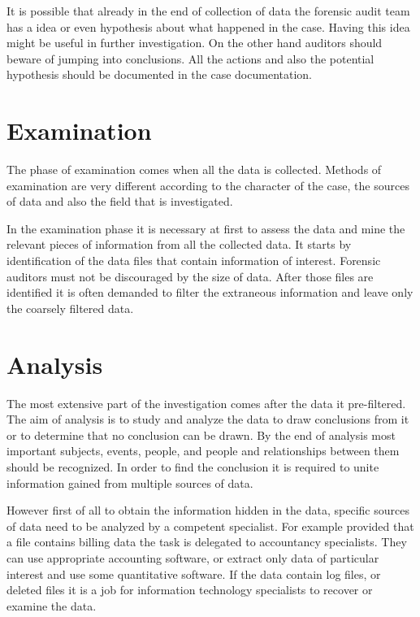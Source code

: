 It is possible that already in the end of collection of data the forensic audit team has a idea or even hypothesis about what happened in the case. Having this idea might be useful in further investigation. On the other hand auditors should beware of jumping into conclusions. All the actions and also the potential hypothesis should be documented in the case documentation. 

\section{Examination}

The phase of examination comes when all the data is collected. Methods of examination are very different according to the character of the case, the sources of data and also the field that is investigated. 

In the examination phase it is necessary at first to assess the data and mine the relevant pieces of information from all the collected data. It starts by identification of the data files that contain information of interest. Forensic auditors must not be discouraged by the size of data. After those files are identified it is often demanded to filter the extraneous information and leave only the coarsely filtered data. 

\section{Analysis}

The most extensive part of the investigation comes after the data it pre-filtered. The aim of analysis is to study and analyze the data to draw conclusions from it or to determine that no conclusion can be drawn. By the end of analysis most important subjects, events, people, and people and relationships between them should be recognized. In order to find the conclusion it is required to unite information gained from multiple sources of data.

However first of all to obtain the information hidden in the data, specific sources of data need to be analyzed by a competent specialist. For example provided that a file contains billing data the task is delegated to accountancy specialists. They can use appropriate accounting software, or extract only data of particular interest and use some quantitative software. If the data contain log files, or deleted files it is a job for information technology specialists to recover or examine the data. 



